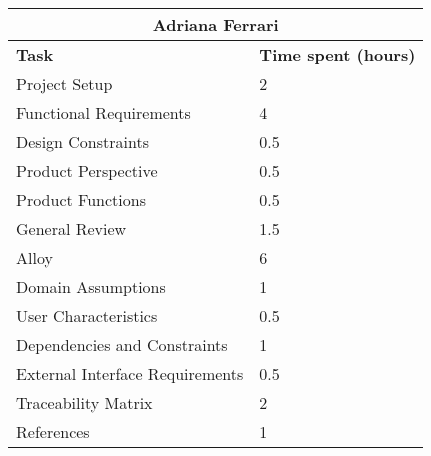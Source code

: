 \begin{table}[h]
  \center
  \begin{tabular}{l|l}
    \multicolumn{2}{c}{\textbf{Adriana Ferrari}} \\
    \hline
    \textbf{Task} & \textbf{Time spent (hours)}\\
    \hline
    Project Setup & 2 \\
    Functional Requirements & 4 \\
    Design Constraints & 0.5 \\
    Product Perspective & 0.5 \\
    Product Functions & 0.5 \\
    General Review & 1.5 \\
    Alloy & 6 \\
    Domain Assumptions & 1 \\
    User Characteristics & 0.5 \\
    Dependencies and Constraints & 1 \\
    External Interface Requirements & 0.5 \\
    Traceability Matrix & 2 \\
    References & 1 \\
  \end{tabular}
\end{table}